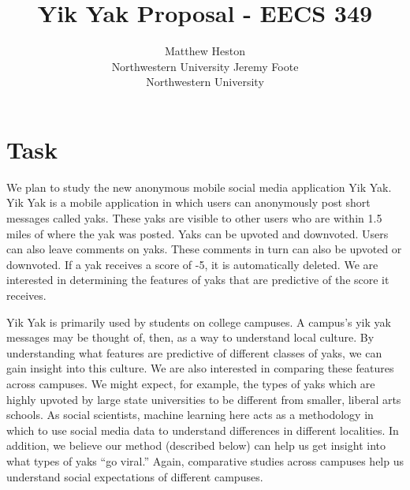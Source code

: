 \documentclass{sigchi}
\begin{document}
\title{Yik Yak Proposal - EECS 349}

\author{
  \alignauthor Matthew Heston\\
  Northwestern University
  \alignauthor Jeremy Foote\\
  Northwestern University
}

\toappear{}
\maketitle


\section{Task}
We plan to study the new anonymous mobile social media application Yik Yak. Yik Yak is a mobile application in which users can anonymously post short messages called yaks. These yaks are visible to other users who are within 1.5 miles of where the yak was posted. Yaks can be upvoted and downvoted. Users can also leave comments on yaks. These comments in turn can also be upvoted or downvoted. If a yak receives a score of -5, it is automatically deleted. We are interested in determining the features of yaks that are predictive of the score it receives.

Yik Yak is primarily used by students on college campuses. A campus’s yik yak messages may be thought of, then, as a way to understand local culture. By understanding what features are predictive of different classes of yaks, we can gain insight into this culture. We are also interested in comparing these features across campuses. We might expect, for example, the types of yaks which are highly upvoted by large state universities to be different from smaller, liberal arts schools. As social scientists, machine learning here acts as a methodology in which to use social media data to understand differences in different localities. In addition, we believe our method (described below) can help us get insight into what types of yaks “go viral.” Again, comparative studies across campuses help us understand social expectations of different campuses.
\end{document}
